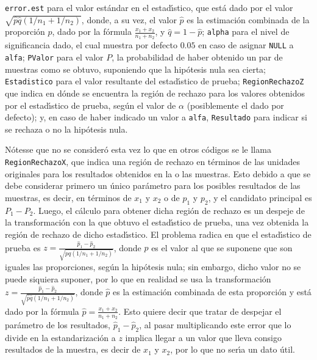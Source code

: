 \begin{solucion}
 \texttt{error.est} para el valor est\'andar en el estad\'{\i}stico,
 que est\'a dado por el valor $\sqrt{\hat{p}\hat{q}(1/n_1 + 1/n_2)}$,
 donde, a su vez, el valor $\hat{p}$ es la estimaci\'on combinada
 de la proporci\'on $p$, dado por la f\'ormula $\frac{x_1+x_2}{n_1+n_2}$,
 y $\hat{q} = 1 - \hat{p}$;
 \texttt{alpha} para el nivel de significancia dado,
 el cual muestra por defecto $0.05$ en caso de asignar \texttt{NULL} a \texttt{alfa};
 \texttt{PValor} para el valor $P$,
 la probabilidad de haber obtenido un par de muestras como se obtuvo,
 suponiendo que la hip\'otesis nula sea cierta;
 \texttt{Estadistico} para el valor resultante del estad\'{\i}stico de prueba;
 \texttt{RegionRechazoZ} que indica en d\'onde se encuentra la regi\'on de rechazo
 para los valores obtenidos por el estad\'{\i}stico de prueba,
 seg\'un el valor de $\alpha$ (posiblemente el dado por defecto);
 y, en caso de haber indicado un valor a \texttt{alfa}, \texttt{Resultado}
 para indicar si se rechaza o no la hip\'otesis nula.
 \par 
 N\'otesse que no se consider\'o esta vez
 lo que en otros c\'odigos se le llama \texttt{RegionRechazoX},
 que indica una regi\'on de rechazo en t\'erminos de las unidades originales
 para los resultados obtenidos en la o las muestras.
 Esto debido a que se debe considerar primero un \'unico par\'ametro
 para los posibles resultados de las muestras,
 es decir, en t\'erminos de $x_1$ y $x_2$ o de $p_1$ y $p_2$,
 y el candidato principal es $P_1 - P_2$. Luego, el c\'alculo
 para obtener dicha regi\'on de rechazo es un despeje de la transformaci\'on
 con la que obtuvo el estad\'{\i}stico de prueba, una vez obtenida la regi\'on
 de rechazo de dicho estad\'{\i}stico.
 El problema radica en que el estad\'{\i}stico de prueba es
 $z = \frac{\hat{p}_1 - \hat{p}_2}{\sqrt{pq(1/n_1 + 1/n_2)}}$,
 donde $p$ es el valor al que se suponene que son iguales las proporciones,
 seg\'un la hip\'otesis nula;
 sin embargo, dicho valor no se puede siquiera suponer,
 por lo que en realidad se usa la transformaci\'on
 $z = \frac{\hat{p}_1 - \hat{p}_2}{\sqrt{\hat{p}\hat{q}(1/n_1 + 1/n_2)}}$,
 donde $\hat{p}$ es la estimaci\'on combinada de esta proporci\'on
 y est\'a dado por la f\'ormula $\hat{p} = \frac{x_1 + x_2}{n_1 + n_2}$.
 Esto quiere decir que tratar de despejar el par\'ametro de los resultados,
 $\hat{p}_1 - \hat{p}_2$, al pasar multiplicando este error
 que lo divide en la estandarizaci\'on a $z$ implica llegar a un valor
 que lleva consigo resultados de la muestra, es decir de $x_1$ y $x_2$,
 por lo que no ser\'{\i}a un dato \'util.

\end{solucion}
